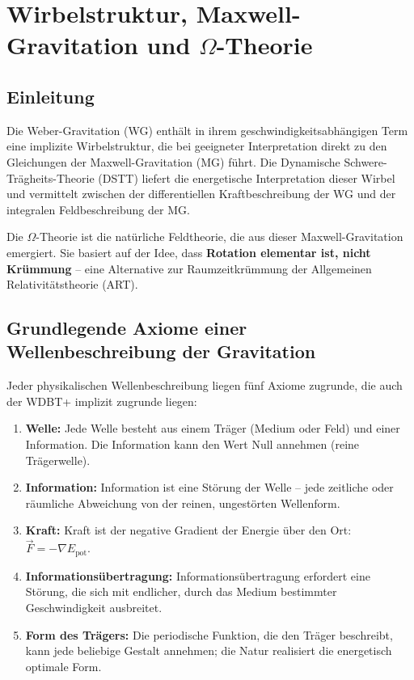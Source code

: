 
\chapter{Wirbelstruktur, Maxwell-Gravitation und \( \Omega \)-Theorie}
\label{ch:maxwell_gravitation}

\section{Einleitung}
\label{sec:mg_einleitung}

Die Weber-Gravitation (WG) enthält in ihrem geschwindigkeitsabhängigen Term eine implizite Wirbelstruktur, die bei geeigneter Interpretation direkt zu den Gleichungen der Maxwell-Gravitation (MG) führt. Die Dynamische Schwere-Trägheits-Theorie (DSTT) liefert die energetische Interpretation dieser Wirbel und vermittelt zwischen der differentiellen Kraftbeschreibung der WG und der integralen Feldbeschreibung der MG.

Die \( \Omega \)-Theorie ist die natürliche Feldtheorie, die aus dieser Maxwell-Gravitation emergiert. Sie basiert auf der Idee, dass \textbf{Rotation elementar ist, nicht Krümmung} – eine Alternative zur Raumzeitkrümmung der Allgemeinen Relativitätstheorie (ART).

\section{Grundlegende Axiome einer Wellenbeschreibung der Gravitation}
\label{sec:wellen_axiome}

Jeder physikalischen Wellenbeschreibung liegen fünf Axiome zugrunde, die auch der WDBT+ implizit zugrunde liegen:

\begin{enumerate}
    \item \textbf{Welle:} Jede Welle besteht aus einem Träger (Medium oder Feld) und einer Information. Die Information kann den Wert Null annehmen (reine Trägerwelle).
    \item \textbf{Information:} Information ist eine Störung der Welle – jede zeitliche oder räumliche Abweichung von der reinen, ungestörten Wellenform.
    \item \textbf{Kraft:} Kraft ist der negative Gradient der Energie über den Ort: \(\vec{F} = -\nabla E_{\text{pot}}\).
    \item \textbf{Informationsübertragung:} Informationsübertragung erfordert eine Störung, die sich mit endlicher, durch das Medium bestimmter Geschwindigkeit ausbreitet.
    \item \textbf{Form des Trägers:} Die periodische Funktion, die den Träger beschreibt, kann jede beliebige Gestalt annehmen; die Natur realisiert die energetisch optimale Form.
\end{enumerate}

